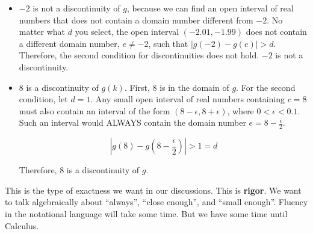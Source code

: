 \documentclass{ximera}
\begin{document}
\begin{example}
\begin{itemize}
First, $4$ is in the domain of $g$. 


For the second condition, let $d = 1$. Any small open interval of real numbers containing $c = 4$ must also contain an interval of the form $(4-\epsilon, 4+\epsilon)$, where $0 < \epsilon < 0.1$.  Such an interval would ALWAYS contain the domain number $e = 4-\frac{\epsilon}{2}$.

\[ \left| g(4) - g\left(4-\frac{\epsilon}{2}\right) \right| >  1 = d \]

Therefore, $4$ is a discontinuity of $g$. 


\item $-2$ is not a discontinuity of $g$, because we can find an open interval of real numbers that does not contain a domain number different from $-2$.  No matter what $d$ you select, the open interval $(-2.01, -1.99)$ does not contain a different domain number, $e \ne -2$, such that $|g(-2) - g(e)| > d$.  Therefore, the second condition for discontinuities does not hold.  $-2$ is not a discontinuity. \\




\item $8$ is a discontinuity of $g(k)$.  First, $8$ is in the domain of $g$. For the second condition, let $d = 1$. Any small open interval of real numbers containing $c = 8$ must also contain an interval of the form $(8-\epsilon, 8+\epsilon)$, where $0 < \epsilon < 0.1$.   Such an interval would ALWAYS contain the domain number $e = 8-\frac{\epsilon}{2}$.

\[ \left| g(8) - g\left(8-\frac{\epsilon}{2}\right) \right| > 1 = d \]

Therefore, $8$ is a discontinuity of $g$.

\end{itemize}



\end{example}

This is the type of exactness we want in our discussions.  This is \textbf{\textcolor{purple!85!blue}{rigor}}. We want to talk algebraically about ``always'', ``close enough'', and ``small enough''.  Fluency in the notational language will take some time.  But we have some time until Calculus.
\end{document}
